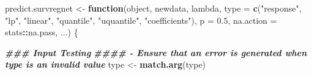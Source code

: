 \documentclass[
]{book}
\newenvironment{Shaded}{\begin{snugshade}}{\end{snugshade}}
\newcommand{\AttributeTok}[1]{\textcolor[rgb]{0.13,0.29,0.53}{#1}}
\newcommand{\ControlFlowTok}[1]{\textcolor[rgb]{0.13,0.29,0.53}{\textbf{#1}}}
\newcommand{\DocumentationTok}[1]{\textcolor[rgb]{0.56,0.35,0.01}{\textbf{\textit{#1}}}}
\newcommand{\FloatTok}[1]{\textcolor[rgb]{0.00,0.00,0.81}{#1}}
\newcommand{\FunctionTok}[1]{\textcolor[rgb]{0.13,0.29,0.53}{\textbf{#1}}}
\newcommand{\NormalTok}[1]{#1}
\newcommand{\OtherTok}[1]{\textcolor[rgb]{0.56,0.35,0.01}{#1}}
\newcommand{\SpecialCharTok}[1]{\textcolor[rgb]{0.81,0.36,0.00}{\textbf{#1}}}
\newcommand{\StringTok}[1]{\textcolor[rgb]{0.31,0.60,0.02}{#1}}
\begin{document}
\begin{Shaded}
\begin{Highlighting}[]
\NormalTok{predict.survregnet }\OtherTok{\textless{}{-}} \ControlFlowTok{function}\NormalTok{(object, newdata, lambda,}
                               \AttributeTok{type =} \FunctionTok{c}\NormalTok{(}\StringTok{"response"}\NormalTok{, }\StringTok{"lp"}\NormalTok{, }\StringTok{"linear"}\NormalTok{, }\StringTok{"quantile"}\NormalTok{,}
                                        \StringTok{"uquantile"}\NormalTok{, }\StringTok{"coefficients"}\NormalTok{),}
                               \AttributeTok{p =} \FloatTok{0.5}\NormalTok{, }\AttributeTok{na.action =}\NormalTok{ stats}\SpecialCharTok{::}\NormalTok{na.pass, ...) \{}

  \DocumentationTok{\#\#\# Input Testing}
  \DocumentationTok{\#\#\#\# {-} Ensure that an error is generated when \textasciigrave{}type\textasciigrave{} is an invalid value}
\NormalTok{  type }\OtherTok{\textless{}{-}} \FunctionTok{match.arg}\NormalTok{(type)}


\end{Highlighting}
\end{Shaded}
\end{document}
